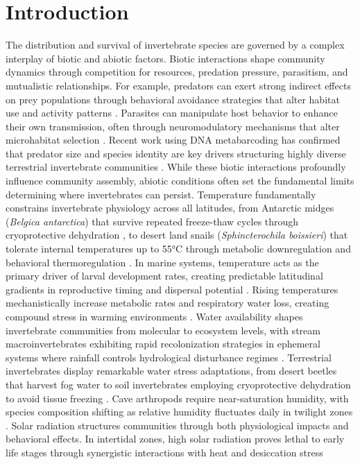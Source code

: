\usepackage{hyperref}
\usepackage{longtable}

\chapter{Introduction}
\label{ch:introduction}

The distribution and survival of invertebrate species are governed by a complex interplay of biotic and abiotic factors. Biotic interactions shape community dynamics through competition for resources, predation pressure, parasitism, and mutualistic relationships. For example, predators can exert strong indirect effects on prey populations through behavioral avoidance strategies that alter habitat use and activity patterns \citep{blois-heulinDirectIndirectEffects1990}. Parasites can manipulate host behavior to enhance their own transmission, often through neuromodulatory mechanisms that alter microhabitat selection \citep{laffertyComparingMechanismsHost2013}. Recent work using DNA metabarcoding has confirmed that predator size and species identity are key drivers structuring highly diverse terrestrial invertebrate communities \citep{miller-ter_kuilePredatorpreyInteractionsTerrestrial2022}. While these biotic interactions profoundly influence community assembly, abiotic conditions often set the fundamental limits determining where invertebrates can persist. Temperature fundamentally constrains invertebrate physiology across all latitudes, from Antarctic midges (\textit{Belgica antarctica}) that survive repeated freeze-thaw cycles through cryoprotective dehydration \citep{everattResponseAntarcticTerrestrial2015}, to desert land snails (\textit{Sphincterochila boissieri}) that tolerate internal temperatures up to 55°C through metabolic downregulation and behavioral thermoregulation \citep{schweizerSnailsHeatHow2019}. In marine systems, temperature acts as the primary driver of larval development rates, creating predictable latitudinal gradients in reproductive timing and dispersal potential \citep{hoegh-guldbergTemperatureFoodAvailability1995}. Rising temperatures mechanistically increase metabolic rates and respiratory water loss, creating compound stress in warming environments \citep{chownInsectPhysiologicalResponses2011}. Water availability shapes invertebrate communities from molecular to ecosystem levels, with stream macroinvertebrates exhibiting rapid recolonization strategies in ephemeral systems where rainfall controls hydrological disturbance regimes \citep{carvalloWaterRainfallMaster2022}. Terrestrial invertebrates display remarkable water stress adaptations, from desert beetles that harvest fog water \citep{chownInsectPhysiologicalResponses2011} to soil invertebrates employing cryoprotective dehydration to avoid tissue freezing \citep{holmstrupCryoprotectiveDehydrationSurvival2002}. Cave arthropods require near-saturation humidity, with species composition shifting as relative humidity fluctuates daily in twilight zones \citep{mammolaMonitoringTemperatureRelative2018}. Solar radiation structures communities through both physiological impacts and behavioral effects. In intertidal zones, high solar radiation proves lethal to early life stages through synergistic interactions with heat and desiccation stress 